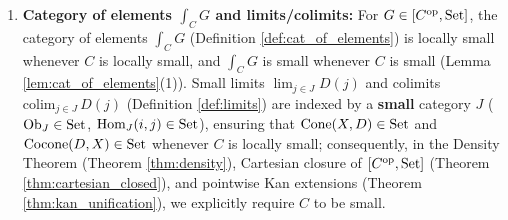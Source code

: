\documentclass[10pt,a4paper]{article}
\begin{document}
\begin{enumerate}
\item \textbf{Category of elements $\int_C G$ and limits/colimits:} For $G \in [C^{\textrm{op}}, {\textrm{Set}}]$, the category of elements $\int_C G$ (Definition \ref{def:cat_of_elements}) is locally small whenever $C$ is locally small, and $\int_C G$ is small whenever $C$ is small (Lemma \ref{lem:cat_of_elements}(1)). Small limits $\lim_{j \in J} D(j)$ and colimits $\mathrm{colim}_{j \in J}\, D(j)$ (Definition \ref{def:limits}) are indexed by a \textbf{small} category $J$ (${\textrm{Ob}}_J \in {\textrm{Set}}$, ${\textrm{Hom}}_J(i, j) \in {\textrm{Set}}$), ensuring that ${\mathrm{Cone}}(X, D) \in {\textrm{Set}}$ and ${\mathrm{Cocone}}(D, X) \in {\textrm{Set}}$ whenever $C$ is locally small; consequently, in the Density Theorem (Theorem \ref{thm:density}), Cartesian closure of $[C^{\textrm{op}}, {\textrm{Set}}]$ (Theorem \ref{thm:cartesian_closed}), and pointwise Kan extensions (Theorem \ref{thm:kan_unification}), we explicitly require $C$ to be small.
\end{enumerate}
\end{document}
